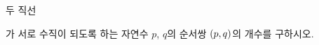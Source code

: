 두 직선 \par\smallskip{}\par\smallskip\noindent 가 서로 수직이 되도록 하는 자연수 $p$, $q$의 순서쌍 $(p{,}\mkern3mu\mathopen{}q)$의 개수를 구하시오.
